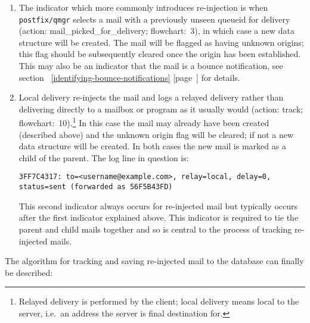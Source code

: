 \documentclass[a4paper,12pt,draft]{article}
\newcommand{\refwithpage}[1]{%
    \empty{}\ref{#1} [page~\pageref{#1}]%
}
\newcommand{\daemon}[1]{%
    \texttt{postfix/#1}%
}
\begin{document}
\begin{enumerate}

    \item The indicator which more commonly introduces re-injection is when
        \daemon{qmgr} selects a mail with a previously unseen queueid for
        delivery (action: mail\_picked\_for\_delivery; flowchart:~3), in
        which case a new data structure will be created.  The mail will be
        flagged as having unknown origins; this flag should be subsequently
        cleared once the origin has been established.  This may also be an
        indicator that the mail is a bounce notification, see
        section~\refwithpage{identifying-bounce-notifications} for details.

    \item Local delivery re-injects the mail and logs a relayed delivery
        rather than delivering directly to a mailbox or program as it
        usually would (action: track; flowchart:~10).\footnote{Relayed
        delivery is performed by the \SMTP{} client; local delivery means
        local to the server, i.e.\ an address the server is final
        destination for.} In this case the mail may already have been
        created (described above) and the unknown origin flag will be
        cleared; if not a new data structure will be created.  In both
        cases the new mail is marked as a child of the parent.  The log
        line in question is:

        \texttt{3FF7C4317: to=<username@example.com>, relay=local, \newline
        delay=0, status=sent (forwarded as 56F5B43FD)}

        This second indicator always occurs for re-injected mail but
        typically occurs after the first indicator explained above.  This
        indicator is required to tie the parent and child mails together
        and so is central to the process of tracking re-injected mails.

\end{enumerate}

The algorithm for tracking and saving re-injected mail to the database can
finally be described:
\end{document}
